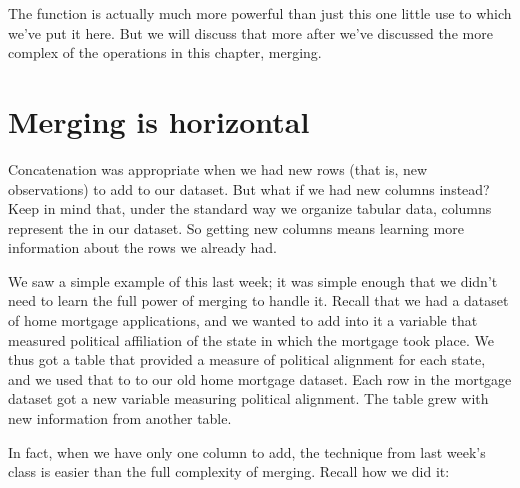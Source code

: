 \documentclass[letterpaper,10pt,english]{sphinxmanual}
\begin{document}
The  function is actually much more powerful than just this one little use to which we’ve put it here.  But we will discuss that more after we’ve discussed the more complex of the operations in this chapter, merging.


\section{Merging is horizontal}
\label{\detokenize{chapter-12-concat-and-merge:merging-is-horizontal}}
Concatenation was appropriate when we had new rows (that is, new observations) to add to our dataset.  But what if we had new columns instead?  Keep in mind that, under the standard way we organize tabular data, columns represent the  in our dataset.  So getting new columns means learning more information about the rows we already had.

We saw a simple example of this last week; it was simple enough that we didn’t need to learn the full power of merging to handle it.  Recall that we had a dataset of home mortgage applications, and we wanted to add into it a variable that measured political affiliation of the state in which the mortgage took place.  We thus got a table that provided a measure of political alignment for each state, and we used that to  to our old home mortgage dataset.  Each row in the mortgage dataset got a new variable measuring political alignment.  The table grew  with new information from another table.

In fact, when we have only one column to add, the technique from last week’s class is easier than the full complexity of merging.  Recall how we did it:

\begin{sphinxVerbatim}[commandchars=\\\{\}]
    \PYG{p}{[}\PYG{p}{]} \PYG{p}{[}\PYG{p}{]}  

\PYG{p}{[}\PYG{p}{]}  \PYG{p}{[}\PYG{p}{]}  
\end{sphinxVerbatim}
\end{document}
